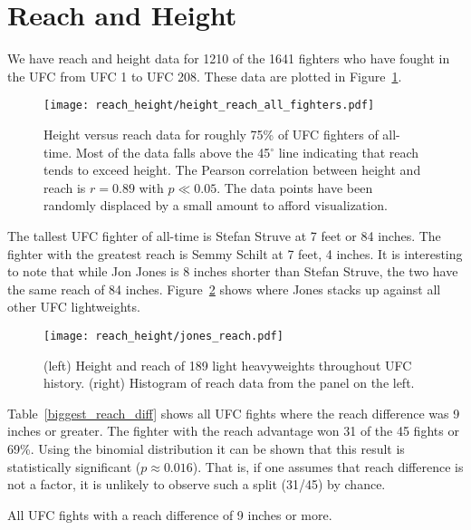 \clearpage
\section*{Reach and Height}

We have reach and height data for 1210 of the 1641 fighters who have fought in the
UFC from UFC 1 to UFC 208. These data are plotted in Figure~\ref{height_reach_all_fighters}.

\begin{figure}[h]
\begin{center}
\texttt{[image: reach\_height/height\_reach\_all\_fighters.pdf]}
\caption{Height versus reach data for roughly 75\% of UFC fighters
of all-time.
Most of the data falls above the 45$^{\circ}$ line indicating that
reach tends to exceed height. The Pearson correlation between height
and reach is $r=0.89$ with $p\ll 0.05$. The data points have been randomly displaced
by a small amount to afford visualization.}
\label{height_reach_all_fighters}
\end{center}
\end{figure}

The tallest UFC fighter of all-time is Stefan Struve at 7 feet or 84 inches. The fighter
with the greatest reach is Semmy Schilt at 7 feet, 4 inches. It is interesting
to note that while Jon Jones is 8 inches shorter than
Stefan Struve, the two have the same reach of 84 inches. Figure~\ref{jones_reach} shows
where Jones stacks up against all other UFC lightweights.

\begin{figure}[h]
\begin{center}
\texttt{[image: reach\_height/jones\_reach.pdf]}
\caption{(left) Height and reach of 189 light heavyweights throughout
UFC history.
(right) Histogram of reach data from the panel on the left.}
\label{jones_reach}
\end{center}
\end{figure}

Table~\ref{biggest_reach_diff} shows all UFC fights where the reach difference
was 9 inches or greater. The fighter with the
reach advantage won 31 of the 45 fights or 69\%. Using the
binomial distribution it can be shown that this result is
statistically significant ($p\approx0.016$). That is, if one
assumes that reach difference is not a factor, it is unlikely to observe
such a split (31/45) by chance.

\begin{center}
\begin{table}[h]

\caption{All UFC fights with a reach difference of 9 inches or more.}
\label{biggest_reach_diff}
\end{table}
\end{center}

